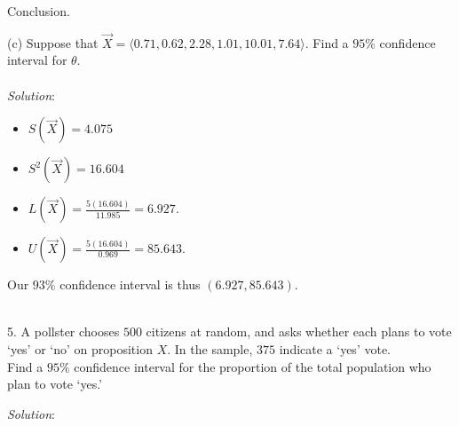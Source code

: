 \documentclass[12pt]{article}
\newcommand{\XB}{\color{black}}
\newcommand{\XBB}{\color{blue}}
\newcommand{\ds}{\displaystyle}
\begin{document}
\noindent
Conclusion. \\

\vspace{2.5mm}

(c) Suppose that $ \overrightarrow{X} = \langle 0.71, 0.62, 2.28, 1.01, 10.01, 7.64 \rangle $.
Find a $ 95\% $ confidence interval for $ \theta $. \\
\vspace{2.5mm} \\
\textit{Solution}:
\vspace{2.5mm} \\

\begin{itemize}
    \item $ \ds S(\overrightarrow{X}) = 4.075 $
    \item $ \ds S^{2}(\overrightarrow{X}) = 16.604 $
    \item $ \ds L(\overrightarrow{X}) = \frac{5(16.604)}{11.985} = 6.927 $. \\
    \item $ \ds U(\overrightarrow{X}) = \frac{5(16.604)}{0.969} = 85.643 $. \\
\end{itemize}

\noindent
Our $ 93\% $ confidence interval is thus $ (6.927, 85.643) $. \\

\vspace{2.5mm}

\newpage
\XBB\hrulefill\XB \\

5. A pollster chooses $ 500 $ citizens at random, and asks whether each plans to vote `yes' or `no' on proposition $ X $.
In the sample, $ 375 $ indicate a `yes' vote. \\

Find a $ 95\% $ confidence interval for the proportion of the total population who plan to vote `yes.'

\XBB\hrulefill\XB
\vspace{5mm}

\vspace{2.5mm}
\textit{Solution}:
\vspace{2.5mm} \\
\end{document}
